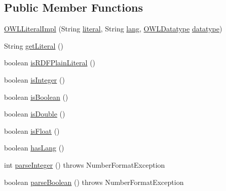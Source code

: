 \subsection*{Public Member Functions}
\begin{DoxyCompactItemize}
\item 
\hyperlink{classuk_1_1ac_1_1manchester_1_1cs_1_1owl_1_1owlapi_1_1_o_w_l_literal_impl_a8254501f6723c25bf0276f2aca034480}{O\-W\-L\-Literal\-Impl} (String \hyperlink{classuk_1_1ac_1_1manchester_1_1cs_1_1owl_1_1owlapi_1_1_o_w_l_literal_impl_aadce851c6acf671e9c1f7595c74cb5f3}{literal}, String \hyperlink{classuk_1_1ac_1_1manchester_1_1cs_1_1owl_1_1owlapi_1_1_o_w_l_literal_impl_a3de0bc1d3e12ca115919cdc550bcdcc2}{lang}, \hyperlink{interfaceorg_1_1semanticweb_1_1owlapi_1_1model_1_1_o_w_l_datatype}{O\-W\-L\-Datatype} \hyperlink{classuk_1_1ac_1_1manchester_1_1cs_1_1owl_1_1owlapi_1_1_o_w_l_literal_impl_a62c8d56f44df21a7b1ee4a58f2815044}{datatype})
\item 
String \hyperlink{classuk_1_1ac_1_1manchester_1_1cs_1_1owl_1_1owlapi_1_1_o_w_l_literal_impl_aa70e7636c1f20e67fc5ede6d018a2b3d}{get\-Literal} ()
\item 
boolean \hyperlink{classuk_1_1ac_1_1manchester_1_1cs_1_1owl_1_1owlapi_1_1_o_w_l_literal_impl_abe1ce6cd2356d575926ad3e6ad8447f2}{is\-R\-D\-F\-Plain\-Literal} ()
\item 
boolean \hyperlink{classuk_1_1ac_1_1manchester_1_1cs_1_1owl_1_1owlapi_1_1_o_w_l_literal_impl_ad842d9a6d86d80ccf7a03719f34fe3eb}{is\-Integer} ()
\item 
boolean \hyperlink{classuk_1_1ac_1_1manchester_1_1cs_1_1owl_1_1owlapi_1_1_o_w_l_literal_impl_a967cce646ffe9abf75e95c0bffd5e049}{is\-Boolean} ()
\item 
boolean \hyperlink{classuk_1_1ac_1_1manchester_1_1cs_1_1owl_1_1owlapi_1_1_o_w_l_literal_impl_a25a1d1180aa94c28ad614bca4e8280c0}{is\-Double} ()
\item 
boolean \hyperlink{classuk_1_1ac_1_1manchester_1_1cs_1_1owl_1_1owlapi_1_1_o_w_l_literal_impl_a20092586668e789d724da6cf65dea149}{is\-Float} ()
\item 
boolean \hyperlink{classuk_1_1ac_1_1manchester_1_1cs_1_1owl_1_1owlapi_1_1_o_w_l_literal_impl_abe7f251b20e4c1d90d62cc2fb67f5a01}{has\-Lang} ()
\item 
int \hyperlink{classuk_1_1ac_1_1manchester_1_1cs_1_1owl_1_1owlapi_1_1_o_w_l_literal_impl_a3f5f8512e171738d6966d6fca1d8285a}{parse\-Integer} ()  throws Number\-Format\-Exception 
\item 
boolean \hyperlink{classuk_1_1ac_1_1manchester_1_1cs_1_1owl_1_1owlapi_1_1_o_w_l_literal_impl_ad86b3ebb0fd24a41d40897945238e069}{parse\-Boolean} ()  throws Number\-Format\-Exception 

\end{DoxyCompactItemize}
